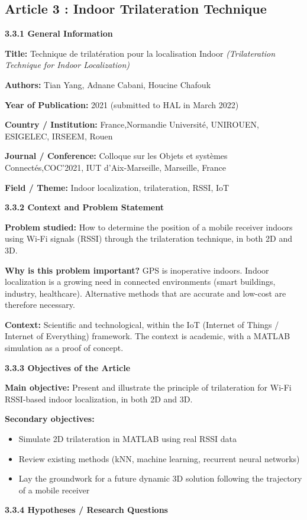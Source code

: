 \documentclass{ipgpmaster}
\begin{document}
\subsection{Article 3 : Indoor Trilateration Technique\textbf{ }
}

\textbf{3.3.1    General Information}

\textbf{Title:} Technique de trilatération pour la localisation Indoor \textit{(Trilateration Technique for Indoor Localization)}

\textbf{Authors:} Tian Yang, Adnane Cabani, Houcine Chafouk

\textbf{Year of Publication:} 2021 (submitted to HAL in March 2022)

\textbf{Country / Institution:} France,Normandie Université, UNIROUEN, ESIGELEC, IRSEEM, Rouen

\textbf{Journal / Conference:} Colloque sur les Objets et systèmes Connectés,COC'2021, IUT d'Aix-Marseille, Marseille, France

\textbf{Field / Theme:} Indoor localization, trilateration, RSSI, IoT

 \textbf{3.3.2   Context and Problem Statement}

\textbf{Problem studied:} How to determine the position of a mobile receiver indoors using Wi-Fi signals (RSSI) through the trilateration technique, in both 2D and 3D.

\textbf{Why is this problem important?} GPS is inoperative indoors. Indoor localization is a growing need in connected environments (smart buildings, industry, healthcare). Alternative methods that are accurate and low-cost are therefore necessary.

\textbf{Context:} Scientific and technological, within the IoT (Internet of Things / Internet of Everything) framework. The context is academic, with a MATLAB simulation as a proof of concept.

 \textbf{3.3.3       Objectives of the Article}

\textbf{Main objective:} Present and illustrate the principle of trilateration for Wi-Fi RSSI-based indoor localization, in both 2D and 3D.

\textbf{Secondary objectives:}

\begin{itemize}
    \item Simulate 2D trilateration in MATLAB using real RSSI data
    \item Review existing methods (kNN, machine learning, recurrent neural networks)
    \item Lay the groundwork for a future dynamic 3D solution following the trajectory of a mobile receiver


\end{itemize}
 \textbf{3.3.4      Hypotheses / Research Questions}
\end{document}
